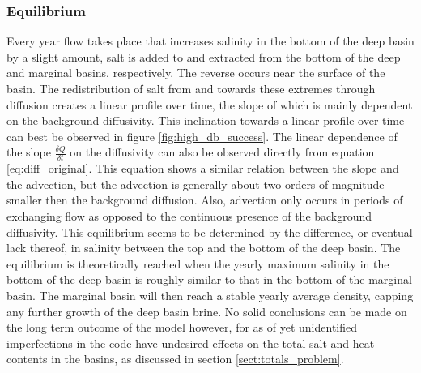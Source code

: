 \documentclass[twocolumn]{article}
\begin{document}
\subsubsection{Equilibrium}
Every year flow takes place that increases salinity in the bottom of the deep basin by a slight amount, salt is added to and extracted from the bottom of the deep and marginal basins, respectively. The reverse occurs near the surface of the basin. The redistribution of salt from and towards these extremes through diffusion creates a linear profile over time, the slope of which is mainly dependent on the background diffusivity. This inclination towards a linear profile over time can best be observed in figure \ref{fig:high_db_success}. The linear dependence of the slope $\frac{\delta Q}{\delta t}$ on the diffusivity can also be observed directly from equation \ref{eq:diff_original}. This equation shows a similar relation between the slope and the advection, but the advection is generally about two orders of magnitude smaller then the background diffusion. Also, advection only occurs in periods of exchanging flow as opposed to the continuous presence of the background diffusivity. 
This equilibrium seems to be determined by the difference, or eventual lack thereof, in salinity between the top and the bottom of the deep basin. The equilibrium is theoretically reached when the yearly maximum salinity in the bottom of the deep basin is roughly similar to that in the bottom of the marginal basin. The marginal basin will then reach a stable yearly average density, capping any further growth of the deep basin brine. No solid conclusions can be made on the long term outcome of the model however, for as of yet unidentified imperfections in the code have undesired effects on the total salt and heat contents in the basins, as discussed in section \ref{sect:totals_problem}.
\end{document}
